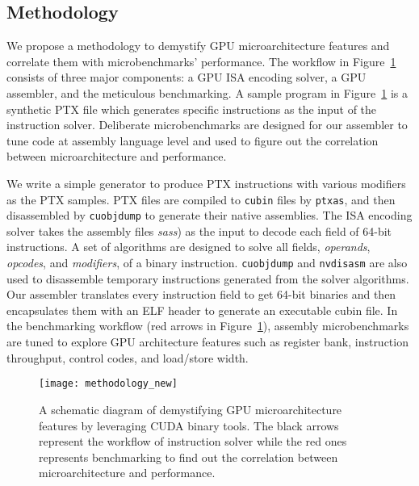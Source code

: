 \subsection{Methodology}


We propose a methodology to demystify GPU microarchitecture features and correlate them with microbenchmarks' performance.
The workflow in Figure~\ref{fig:workflow} consists of three major components: a GPU ISA encoding solver, a GPU assembler, and the meticulous benchmarking.
A sample program in Figure~\ref{fig:workflow} is a synthetic PTX file which generates specific instructions as the input of the instruction solver.
Deliberate microbenchmarks are designed for our assembler to tune code at assembly language level and used to figure out the correlation between microarchitecture and performance.


We write a simple generator to produce PTX instructions with various modifiers as the PTX samples.
PTX files are compiled to {\tt cubin} files by {\tt ptxas}, and then disassembled by {\tt cuobjdump} to generate their native assemblies. 
The ISA encoding solver takes the assembly files {\em sass}) as the input to decode each field of 64-bit instructions.
A set of algorithms are designed to solve all fields, {\em operands}, {\em opcodes}, and {\em modifiers}, of a binary instruction.
{\tt cuobjdump} and {\tt nvdisasm} are also used to disassemble temporary instructions generated from the solver algorithms.
Our assembler translates every instruction field to get 64-bit binaries and then encapsulates them with an ELF header to generate an executable cubin file.
In the benchmarking workflow (red arrows in Figure~\ref{fig:workflow}), assembly microbenchmarks are tuned to explore GPU architecture features such as register bank, instruction throughput, control codes, and load/store width.


\begin{figure}[htbp]
\begin{center}
    \texttt{[image: methodology\_new]}
\caption{A schematic diagram of demystifying GPU microarchitecture features by leveraging CUDA binary tools. The black arrows
    represent the workflow of instruction solver while the red ones represents benchmarking to find out the correlation between microarchitecture and performance.}
\label{fig:workflow}
\end{center}
\end{figure}
